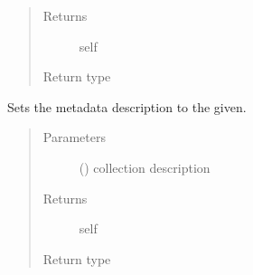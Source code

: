 \documentclass[letterpaper,10pt,english]{sphinxmanual}
\begin{document}
\begin{fulllineitems}
\begin{fulllineitems}
\begin{quote}
\begin{description}
\item[{Returns}] \leavevmode
self

\item[{Return type}] \leavevmode
{\hyperref[\detokenize{autoapi/pine/client/models/index:pine.client.models.CollectionBuilder}]{}}

\end{description}\end{quote}

\end{fulllineitems}


\begin{fulllineitems}
\label{\detokenize{autoapi/pine/client/index:pine.client.CollectionBuilder.description}}
Sets the metadata description to the given.
\begin{quote}\begin{description}
\item[{Parameters}] \leavevmode
{} () \textendash{} collection description

\item[{Returns}] \leavevmode
self

\item[{Return type}] \leavevmode
{\hyperref[\detokenize{autoapi/pine/client/models/index:pine.client.models.CollectionBuilder}]{}}

\end{description}\end{quote}

\end{fulllineitems}



\end{fulllineitems}
\end{document}
